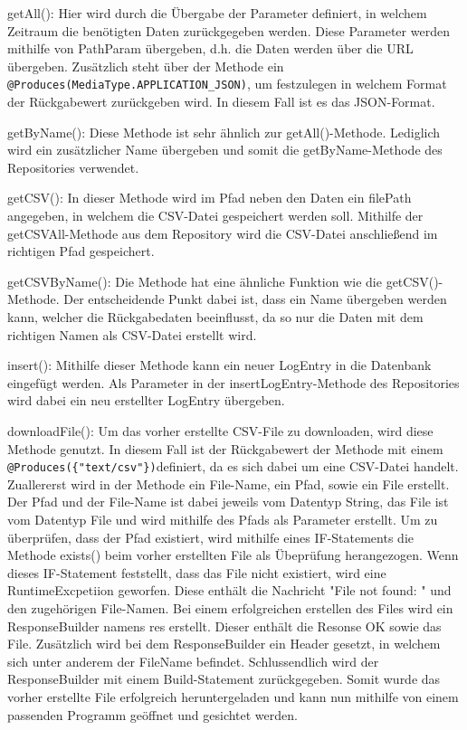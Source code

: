 \begin{compactitem}
    \item getAll(): Hier wird durch die Übergabe der Parameter definiert, in welchem Zeitraum die benötigten Daten zurückgegeben werden. Diese Parameter werden mithilfe von PathParam übergeben, d.h. die Daten werden über die URL übergeben. Zusätzlich steht über der Methode ein \texttt{@Produces(MediaType.APPLICATION\_JSON)}, um festzulegen in welchem Format der Rückgabewert zurückgeben wird. In diesem Fall ist es das JSON-Format.
    \item getByName(): Diese Methode ist sehr ähnlich zur getAll()-Methode. Lediglich wird ein zusätzlicher Name übergeben und somit die getByName-Methode des Repositories verwendet. 
    \item getCSV(): In dieser Methode wird im Pfad neben den Daten ein filePath angegeben, in welchem die CSV-Datei gespeichert werden soll. Mithilfe der getCSVAll-Methode aus dem Repository wird die CSV-Datei anschließend im richtigen Pfad gespeichert. 
    \item getCSVByName(): Die Methode hat eine ähnliche Funktion wie die getCSV()-Methode. Der entscheidende Punkt dabei ist, dass ein Name übergeben werden kann, welcher die Rückgabedaten beeinflusst, da so nur die Daten mit dem richtigen Namen als CSV-Datei erstellt wird.  
    \item insert(): Mithilfe dieser Methode kann ein neuer LogEntry in die Datenbank eingefügt werden. Als Parameter in der insertLogEntry-Methode des Repositories wird dabei ein neu erstellter LogEntry übergeben.
    \item downloadFile(): Um das vorher erstellte CSV-File zu downloaden, wird diese Methode genutzt. In diesem Fall ist der Rückgabewert der Methode mit einem \texttt{@Produces(\{"text/csv"\})}definiert, da es sich dabei um eine CSV-Datei handelt. Zuallererst wird in der Methode ein File-Name, ein Pfad, sowie ein File erstellt. Der Pfad und der File-Name ist dabei jeweils vom Datentyp String, das File ist vom Datentyp File und wird mithilfe des Pfads als Parameter erstellt. Um zu überprüfen, dass der Pfad existiert, wird mithilfe eines IF-Statements die Methode exists() beim vorher erstellten File als Übeprüfung herangezogen. Wenn dieses IF-Statement feststellt, dass das File nicht existiert, wird eine RuntimeExcpetiion geworfen. Diese enthält die Nachricht "File not found: " und den zugehörigen File-Namen. Bei einem erfolgreichen erstellen des Files wird ein ResponseBuilder namens res erstellt. Dieser enthält die Resonse OK sowie das File. Zusätzlich wird bei dem ResponseBuilder ein Header gesetzt, in welchem sich unter anderem der FileName befindet. Schlussendlich wird der ResponseBuilder mit einem Build-Statement zurückgegeben.  Somit wurde das vorher erstellte File erfolgreich heruntergeladen und kann nun mithilfe von einem passenden Programm geöffnet und gesichtet werden.
\end{compactitem}


